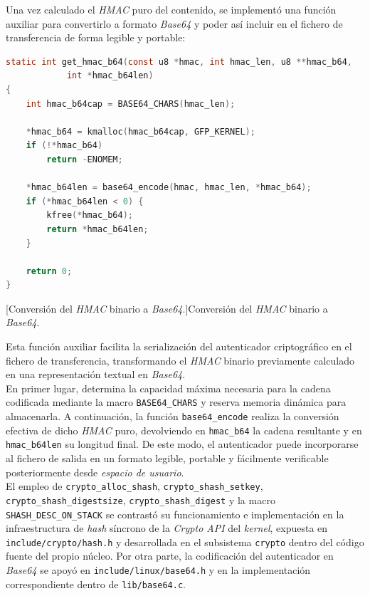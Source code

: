 Una vez calculado el \textit{HMAC} puro del contenido, se implementó una función auxiliar para convertirlo a formato \textit{Base64} y poder así incluir en el fichero de transferencia de forma legible y portable:

\begin{lstlisting}[language=C]
static int get_hmac_b64(const u8 *hmac, int hmac_len, u8 **hmac_b64,
			int *hmac_b64len)
{
	int hmac_b64cap = BASE64_CHARS(hmac_len);

	*hmac_b64 = kmalloc(hmac_b64cap, GFP_KERNEL);
	if (!*hmac_b64)
		return -ENOMEM;

	*hmac_b64len = base64_encode(hmac, hmac_len, *hmac_b64);
	if (*hmac_b64len < 0) {
		kfree(*hmac_b64);
		return *hmac_b64len;
	}

	return 0;
}
\end{lstlisting}
\captionsetup{type=code,justification=centering,singlelinecheck=false}
[Conversión del \textit{HMAC} binario a \textit{Base64}.]{Conversión del \textit{HMAC} binario a \textit{Base64}.}
\label{cod:crypto_get_hmac_b64}
\vspace{\baselineskip}

Esta función auxiliar facilita la serialización del autenticador criptográfico en el fichero de transferencia, transformando el \textit{HMAC} binario previamente calculado en una representación textual en \textit{Base64}.\\

En primer lugar, determina la capacidad máxima necesaria para la cadena codificada mediante la macro \verb|BASE64_CHARS| y reserva memoria dinámica para almacenarla.
A continuación, la función \verb|base64_encode| realiza la conversión efectiva de dicho \textit{HMAC} puro, devolviendo en \verb|hmac_b64| la cadena resultante y en \verb|hmac_b64len| su longitud final.
De este modo, el autenticador puede incorporarse al fichero de salida en un formato legible, portable y fácilmente verificable posteriormente desde \textit{espacio de usuario}.\\

El empleo de \verb|crypto_alloc_shash|, \verb|crypto_shash_setkey|, \verb|crypto_shash_digestsize|, \verb|crypto_shash_digest| y la macro \verb|SHASH_DESC_ON_STACK| se contrastó su funcionamiento e implementación en la infraestructura de \textit{hash} síncrono de la \textit{Crypto API} del \textit{kernel}, expuesta en \texttt{include/crypto/hash.h} y desarrollada en el subsistema \texttt{crypto} dentro del código fuente del propio núcleo.
Por otra parte, la codificación del autenticador en \textit{Base64} se apoyó en \texttt{include/linux/base64.h} y en la implementación correspondiente dentro de \texttt{lib/base64.c}.\\

